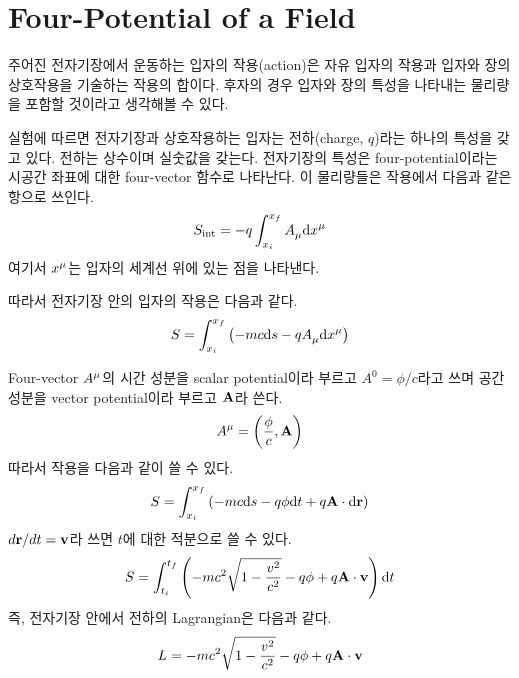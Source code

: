 \section{Four-Potential of a Field}
\label{sec:05a-02a}

주어진 전자기장에서 운동하는 입자의 작용(action)은 자유 입자의 작용과 입자와 장의 상호작용을 기술하는 작용의 합이다. 후자의 경우 입자와 장의 특성을 나타내는 물리량을 포함할 것이라고 생각해볼 수 있다.

실험에 따르면 전자기장과 상호작용하는 입자는 전하(charge, $q$)라는 하나의 특성을 갖고 있다. 전하는 상수이며 실숫값을 갖는다. 전자기장의 특성은 four-potential이라는 시공간 좌표에 대한 four-vector 함수로 나타난다. 이 물리량들은 작용에서 다음과 같은 항으로 쓰인다.
\begin{equation*}
    S_\textrm{int} = - q \int ^{x_f} _{x_i} \tensor{A}{_\mu} \dd \tensor{x}{^\mu}
\end{equation*}
여기서 $\tensor{x}{^\mu}$는 입자의 세계선 위에 있는 점을 나타낸다.

따라서 전자기장 안의 입자의 작용은 다음과 같다.
\begin{equation}
    S = \int ^{x_f} _{x_i} \left( - m c \dd s - q \tensor{A}{_\mu} \dd \tensor{x}{^\mu} \right)
\end{equation}

Four-vector $\tensor{A}{^\mu}$의 시간 성분을 scalar potential이라 부르고 $A^0 = \phi / c$라고 쓰며 공간 성분을 vector potential이라 부르고 $\vb{A}$라 쓴다.
\begin{equation}
    \tensor{A}{^\mu} = \left( \frac{\phi}{c}, \vb{A} \right)
\end{equation}
따라서 작용을 다음과 같이 쓸 수 있다.
\begin{equation*}
    S = \int ^{x_f} _{x_i} \left( - m c \dd s - q \phi \dd t + q \vb{A} \cdot \dd \vb{r} \right)
\end{equation*}
$d\vb{r} / dt = \vb{v}$라 쓰면 $t$에 대한 적분으로 쓸 수 있다.
\begin{equation}
    S = \int ^{t_f} _{t_i} \left( - m c^2 \sqrt{1 - \frac{v^2}{c^2}} - q \phi + q \vb{A} \cdot \vb{v} \right) \dd t
\end{equation}
즉, 전자기장 안에서 전하의 Lagrangian은 다음과 같다.
\begin{equation}\label{eq:ll1604}
    L = - m c^2 \sqrt{1 - \frac{v^2}{c^2}} - q \phi + q \vb{A} \cdot \vb{v}
\end{equation}

